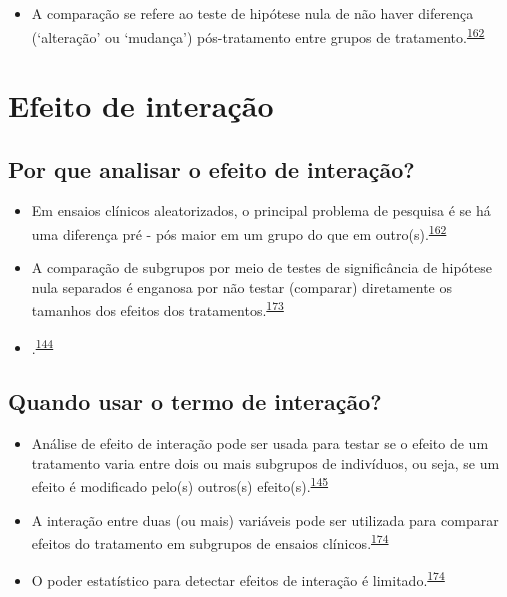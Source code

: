 \documentclass[
  a4paper,
]{book}
\providecommand{\tightlist}{%
  \setlength{\itemsep}{0pt}\setlength{\parskip}{0pt}}
\begin{document}
\begin{itemize}
\tightlist
\item
  A comparação se refere ao teste de hipótese nula de não haver diferença (`alteração' ou `mudança') pós-tratamento entre grupos de tratamento.\textsuperscript{\protect\hyperlink{ref-bland2011}{162}}
\end{itemize}

\hypertarget{interacao}{%
\section{Efeito de interação}\label{interacao}}

\hypertarget{por-que-analisar-o-efeito-de-interauxe7uxe3o}{%
\subsection{Por que analisar o efeito de interação?}\label{por-que-analisar-o-efeito-de-interauxe7uxe3o}}

\begin{itemize}
\item
  Em ensaios clínicos aleatorizados, o principal problema de pesquisa é se há uma diferença pré - pós maior em um grupo do que em outro(s).\textsuperscript{\protect\hyperlink{ref-bland2011}{162}}
\item
  A comparação de subgrupos por meio de testes de significância de hipótese nula separados é enganosa por não testar (comparar) diretamente os tamanhos dos efeitos dos tratamentos.\textsuperscript{\protect\hyperlink{ref-Matthews1996}{173}}
\item
  .\textsuperscript{\protect\hyperlink{ref-Bours2023}{144}}
\end{itemize}

\hypertarget{quando-usar-o-termo-de-interauxe7uxe3o}{%
\subsection{Quando usar o termo de interação?}\label{quando-usar-o-termo-de-interauxe7uxe3o}}

\begin{itemize}
\item
  Análise de efeito de interação pode ser usada para testar se o efeito de um tratamento varia entre dois ou mais subgrupos de indivíduos, ou seja, se um efeito é modificado pelo(s) outros(s) efeito(s).\textsuperscript{\protect\hyperlink{ref-Altman1996}{145}}
\item
  A interação entre duas (ou mais) variáveis pode ser utilizada para comparar efeitos do tratamento em subgrupos de ensaios clínicos.\textsuperscript{\protect\hyperlink{ref-Altman2003}{174}}
\item
  O poder estatístico para detectar efeitos de interação é limitado.\textsuperscript{\protect\hyperlink{ref-Altman2003}{174}}
\end{itemize}
\end{document}
